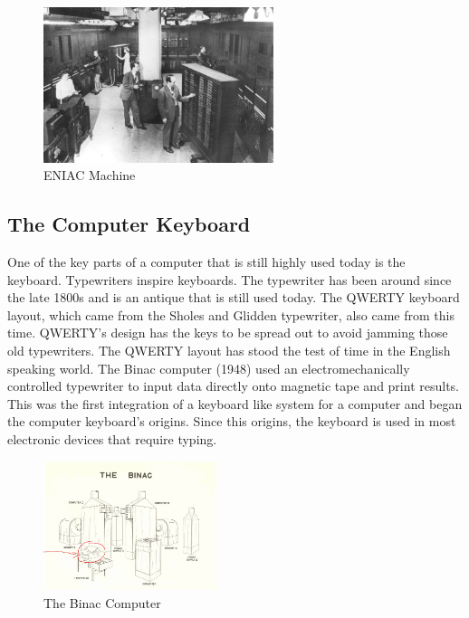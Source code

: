 \documentclass{article}
\begin{document}
\begin{figure}[h!]
    \caption{ENIAC Machine}
    \label{image:ENIAC}
    \centering
    \includegraphics[width=0.6\textwidth]{pics/eniac.jpg}
\end{figure}
\newpage
\subsection{The Computer Keyboard}
One of the key parts of a computer that is still highly used today is the keyboard. Typewriters inspire keyboards. The typewriter has been around since the late 1800s and is an antique that is still used today. The QWERTY keyboard layout, which came from the Sholes and Glidden typewriter, also came from this time. QWERTY’s design has the keys to be spread out to avoid jamming those old typewriters. The QWERTY layout has stood the test of time in the English speaking world. The Binac computer (1948) used an electromechanically controlled typewriter to input data directly onto magnetic tape and print results. This was the first integration of a keyboard like system for a computer and began the computer keyboard’s origins. Since this origins, the keyboard is used in most electronic devices that require typing. 
\cite{ref3}

\begin{figure}[h!]
    \caption{The Binac Computer}
    \label{image:BINAC}
    \centering
    \includegraphics[width=0.45\textwidth]{pics/binac.jpg}
\end{figure}
\end{document}
